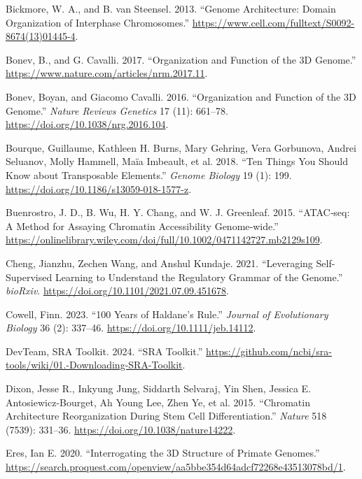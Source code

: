 \documentclass[
  a4paper,
  openany]{scrbook}
\newlength{\cslhangindent}
\newenvironment{CSLReferences}[2] %
 {\begin{list}{}{%
  \setlength{\itemindent}{0pt}
  \setlength{\leftmargin}{0pt}
  \setlength{\parsep}{0pt}
  \ifodd #1
   \setlength{\leftmargin}{\cslhangindent}
   \setlength{\itemindent}{-1\cslhangindent}
  \fi
  \setlength{\itemsep}{#2\baselineskip}}}
 {\end{list}}
\begin{document}
\begin{CSLReferences}{1}{0}
Bickmore, W. A., and B. van Steensel. 2013. {``Genome Architecture:
Domain Organization of Interphase Chromosomes.''}
\url{https://www.cell.com/fulltext/S0092-8674(13)01445-4}.

Bonev, B., and G. Cavalli. 2017. {``Organization and Function of the 3D
Genome.''} \url{https://www.nature.com/articles/nrm.2017.11}.

Bonev, Boyan, and Giacomo Cavalli. 2016. {``Organization and Function of
the 3D Genome.''} \emph{Nature Reviews Genetics} 17 (11): 661--78.
\url{https://doi.org/10.1038/nrg.2016.104}.

Bourque, Guillaume, Kathleen H. Burns, Mary Gehring, Vera Gorbunova,
Andrei Seluanov, Molly Hammell, Maïa Imbeault, et al. 2018. {``Ten
Things You Should Know about Transposable Elements.''} \emph{Genome
Biology} 19 (1): 199. \url{https://doi.org/10.1186/s13059-018-1577-z}.

Buenrostro, J. D., B. Wu, H. Y. Chang, and W. J. Greenleaf. 2015.
{``ATAC‐seq: A Method for Assaying Chromatin Accessibility
Genome‐wide.''}
\url{https://onlinelibrary.wiley.com/doi/full/10.1002/0471142727.mb2129s109}.

Cheng, Jianzhu, Zechen Wang, and Anshul Kundaje. 2021. {``Leveraging
Self-Supervised Learning to Understand the Regulatory Grammar of the
Genome.''} \emph{bioRxiv}.
\url{https://doi.org/10.1101/2021.07.09.451678}.

Cowell, Finn. 2023. {``100 Years of Haldane's Rule.''} \emph{Journal of
Evolutionary Biology} 36 (2): 337--46.
\url{https://doi.org/10.1111/jeb.14112}.

DevTeam, SRA Toolkit. 2024. {``SRA Toolkit.''}
\url{https://github.com/ncbi/sra-tools/wiki/01.-Downloading-SRA-Toolkit}.

Dixon, Jesse R., Inkyung Jung, Siddarth Selvaraj, Yin Shen, Jessica E.
Antosiewicz-Bourget, Ah Young Lee, Zhen Ye, et al. 2015. {``Chromatin
Architecture Reorganization During Stem Cell Differentiation.''}
\emph{Nature} 518 (7539): 331--36.
\url{https://doi.org/10.1038/nature14222}.

Eres, Ian E. 2020. {``Interrogating the 3D Structure of Primate
Genomes.''}
\url{https://search.proquest.com/openview/aa5bbe354d64adcf72268e43513078bd/1}.


\end{CSLReferences}
\end{document}
